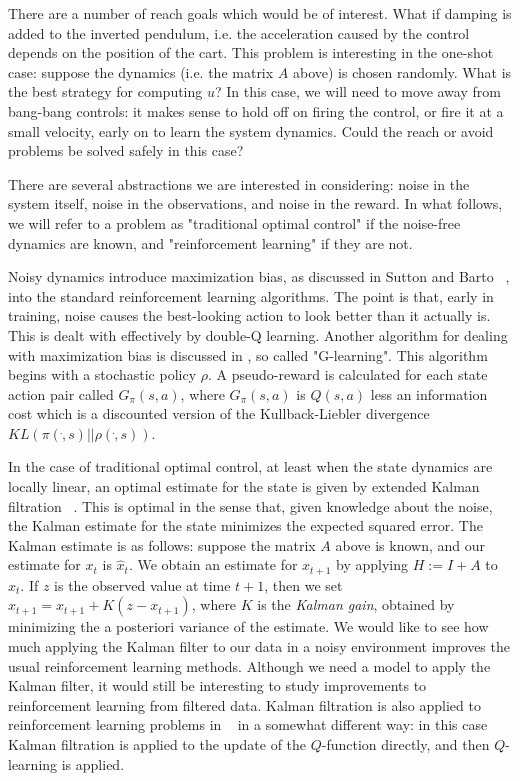 \documentclass{article}
\begin{document}
There are a number of reach goals which would be of interest. What if damping is added to the inverted pendulum, i.e. the acceleration caused by the control depends on the position of the cart. This problem is interesting in the one-shot case: suppose the dynamics (i.e. the matrix $A$ above) is chosen randomly. What is the best strategy for computing $u$? In this case, we will need to move away from bang-bang controls: it makes sense to hold off on firing the control, or fire it at a small velocity, early on to learn the system dynamics. Could the reach or avoid problems be solved safely in this case?

There are several abstractions we are interested in considering: noise in the system itself, noise in the observations, and noise in the reward. In what follows, we will refer to a problem as "traditional optimal control" if the noise-free dynamics are known, and "reinforcement learning" if they are not. 

Noisy dynamics introduce maximization bias, as discussed in Sutton and Barto ~\cite{suttonAndBarto}, into the standard reinforcement learning algorithms. The point is that, early in training, noise causes the best-looking action to look better than it actually is. This is dealt with effectively by double-Q learning. Another algorithm for dealing with maximization bias is discussed in \cite{foxPakmanTishby}, so called "G-learning". This algorithm begins with a stochastic policy $\rho$. A pseudo-reward is calculated for each state action pair called $G_\pi(s,a)$, where $G_\pi(s,a)$ is $Q(s,a)$ less an information cost which is a discounted version of the Kullback-Liebler divergence $KL(\pi( \dot , s) || \rho( \dot , s))$.

In the case of traditional optimal control, at least when the state dynamics are locally linear, an  optimal estimate for the state is given by extended Kalman filtration ~\cite{welchBishop}. This is optimal in the sense that, given knowledge about the noise, the Kalman estimate for the state minimizes the expected squared error. The Kalman estimate is as follows: suppose the matrix $A$ above is known, and our estimate for $x_t$ is $\hat x_t$. We obtain an estimate for $x_{t+1}$ by applying $H := I+A$ to $\hat x_t$. If $z$ is the observed value at time $t+1$, then we set $\hat x_{t+1} = x_{t+1} + K (z - x_{t+1})$, where $K$ is the {\em Kalman gain}, obtained by minimizing the a posteriori variance of the estimate. We would like to see how much applying the Kalman filter to our data in a noisy environment improves the usual reinforcement learning methods. Although we need a model to apply the Kalman filter, it would still be interesting to study improvements to reinforcement learning from filtered data. Kalman filtration is also applied to reinforcement learning problems in ~\cite{trippSchacter} in a somewhat different way: in this case Kalman filtration is applied to the update of the $Q$-function directly, and then $Q$-learning is applied.
\end{document}
